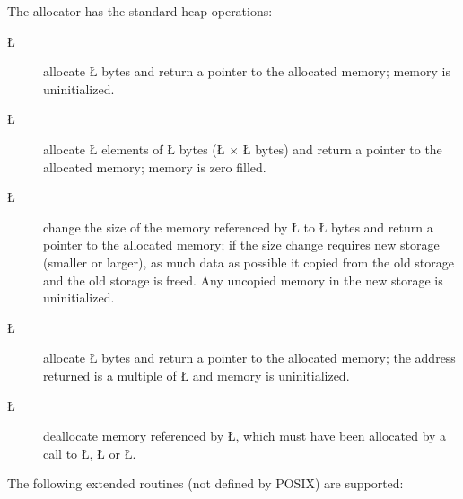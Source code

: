 \documentclass[openright,twoside]{report}
\begin{document}
The \uC allocator has the standard heap-operations:
\begin{description}
\item[\LGinlinetrue\LGbegin\lgrinde\L{}\endlgrinde\LGend{}] allocate \LGinlinetrue\LGbegin\lgrinde\L{}\endlgrinde\LGend{} bytes and return a pointer to the allocated memory; memory is uninitialized.
\item[\LGinlinetrue\LGbegin\lgrinde\L{}\endlgrinde\LGend{}] allocate \LGinlinetrue\LGbegin\lgrinde\L{}\endlgrinde\LGend{} elements of \LGinlinetrue\LGbegin\lgrinde\L{}\endlgrinde\LGend{} bytes (\LGinlinetrue\LGbegin\lgrinde\L{}\endlgrinde\LGend{} $\times$ \LGinlinetrue\LGbegin\lgrinde\L{}\endlgrinde\LGend{} bytes) and return a pointer to the allocated memory; memory is zero filled.
\item[\LGinlinetrue\LGbegin\lgrinde\L{}\endlgrinde\LGend{}] change the size of the memory referenced by \LGinlinetrue\LGbegin\lgrinde\L{}\endlgrinde\LGend{} to \LGinlinetrue\LGbegin\lgrinde\L{}\endlgrinde\LGend{} bytes and return a pointer to the allocated memory; if the size change requires new storage (smaller or larger), as much data as possible it copied from the old storage and the old storage is freed.
Any uncopied memory in the new storage is uninitialized.
\item[\LGinlinetrue\LGbegin\lgrinde\L{}\endlgrinde\LGend{}] allocate \LGinlinetrue\LGbegin\lgrinde\L{}\endlgrinde\LGend{} bytes and return a pointer to the allocated memory; the address returned is a multiple of \LGinlinetrue\LGbegin\lgrinde\L{}\endlgrinde\LGend{} and memory is uninitialized.
\item[\LGinlinetrue\LGbegin\lgrinde\L{}\endlgrinde\LGend{}] deallocate memory referenced by \LGinlinetrue\LGbegin\lgrinde\L{}\endlgrinde\LGend{}, which must have been allocated by a call to \LGinlinetrue\LGbegin\lgrinde\L{}\endlgrinde\LGend{}, \LGinlinetrue\LGbegin\lgrinde\L{}\endlgrinde\LGend{} or \LGinlinetrue\LGbegin\lgrinde\L{}\endlgrinde\LGend{}.
\end{description}
The following extended routines (not defined by POSIX) are supported:
\end{document}
